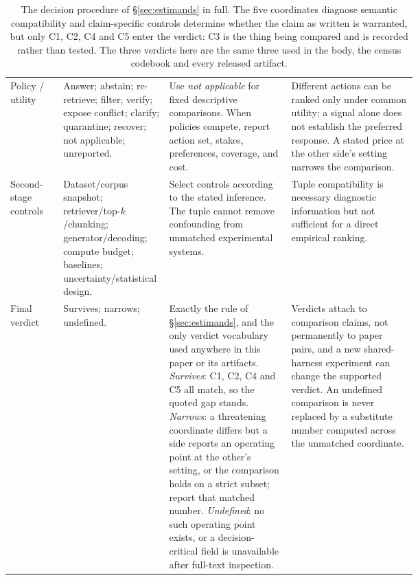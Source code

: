 \begin{table}[t]
\begin{tabularx}{\linewidth}{>{\raggedright\arraybackslash}p{0.13\linewidth}>{\raggedright\arraybackslash}p{0.26\linewidth}>{\raggedright\arraybackslash}p{0.30\linewidth}X}
Policy / utility & Answer; abstain; re-retrieve; filter; verify; expose conflict; clarify; quarantine; recover; not applicable; unreported. & Use \emph{not applicable} for fixed descriptive comparisons. When policies compete, report action set, stakes, preferences, coverage, and cost. & Different actions can be ranked only under common utility; a signal alone does not establish the preferred response. A stated price at the other side's setting narrows the comparison. \\
Second-stage controls & Dataset/corpus snapshot; retriever/top-$k$/chunking; generator/decoding; compute budget; baselines; uncertainty/statistical design. & Select controls according to the stated inference. The tuple cannot remove confounding from unmatched experimental systems. & Tuple compatibility is necessary diagnostic information but not sufficient for a direct empirical ranking. \\
Final verdict & Survives; narrows; undefined. & Exactly the rule of \S\ref{sec:estimands}, and the only verdict vocabulary used anywhere in this paper or its artifacts. \emph{Survives}: C1, C2, C4 and C5 all match, so the quoted gap stands. \emph{Narrows}: a threatening coordinate differs but a side reports an operating point at the other's setting, or the comparison holds on a strict subset; report that matched number. \emph{Undefined}: no such operating point exists, or a decision-critical field is unavailable after full-text inspection. & Verdicts attach to comparison claims, not permanently to paper pairs, and a new shared-harness experiment can change the supported verdict. An undefined comparison is never replaced by a substitute number computed across the unmatched coordinate. \\
\bottomrule
\end{tabularx}
\caption{The decision procedure of \S\ref{sec:estimands} in full. The five coordinates diagnose semantic compatibility and claim-specific controls determine whether the claim as written is warranted, but only C1, C2, C4 and C5 enter the verdict: C3 is the thing being compared and is recorded rather than tested. The three verdicts here are the same three used in the body, the census codebook and every released artifact.}
\label{tab:framework-decision-procedure}
\end{table}
